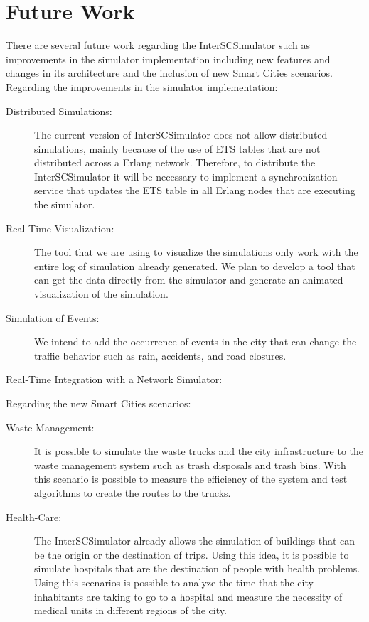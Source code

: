 \section{Future Work}

There are several future work regarding the InterSCSimulator such as improvements in the simulator implementation including new features and changes in its architecture and the inclusion of new Smart Cities scenarios. Regarding the improvements in the simulator implementation:

\begin{description}

\item[Distributed Simulations:] The current version of InterSCSimulator does not allow distributed simulations, mainly because of the use of ETS tables that are not distributed across a Erlang network. Therefore, to distribute the InterSCSimulator it will be necessary to implement a synchronization service that updates the ETS table in all Erlang nodes that are executing the simulator.

\item[Real-Time Visualization:] The tool that we are using to visualize the simulations only work with the entire log of simulation already generated. We plan to develop a tool that can get the data directly from the simulator and generate an animated visualization  of the simulation.

\item[Simulation of Events:] We intend to add the occurrence of events in the city that can change the traffic behavior such as rain, accidents, and road closures.

\item[Real-Time Integration with a Network Simulator:] 

\end{description}

Regarding the new Smart Cities scenarios:

\begin{description}

\item[Waste Management:] It is possible to simulate the waste trucks and the city infrastructure to the waste management system such as trash disposals and trash bins. With this scenario is possible to measure the efficiency of the system and test algorithms to create the routes to the trucks.

\item[Health-Care:] The InterSCSimulator already allows the simulation of buildings that can be the origin or the destination of trips. Using this idea, it is possible to simulate hospitals that are the destination of people with health problems. Using this scenarios is possible to analyze the time that the city inhabitants are taking to go to a hospital and measure the necessity of medical units in different regions of the city.

\end{description}